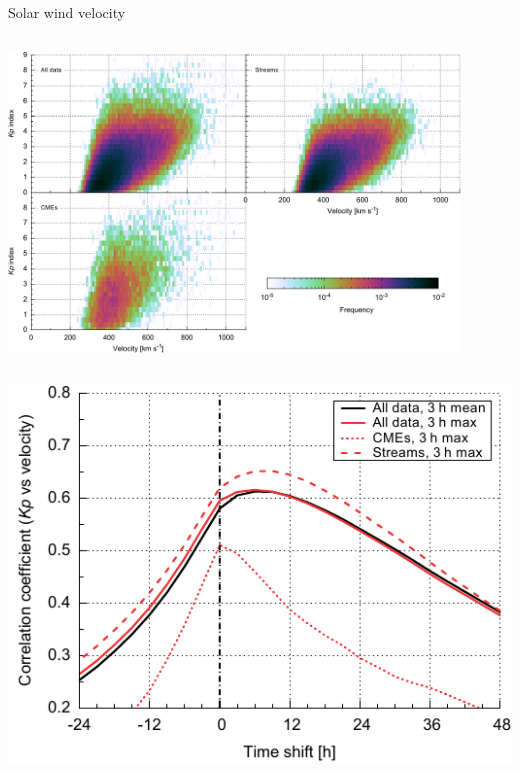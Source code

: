 \begin{frame}[plain,c]{Solar wind velocity}{}
	\begin{columns}[c]
	\column{\textwidth}
		
		\centering
		\includegraphics[width=0.9\textwidth]{../figures_of_mine/chapter2/Kp_2dhistogram_V_sws_e.pdf}

	\end{columns}
\end{frame}
\begin{frame}[plain,c]{}{}
	\begin{columns}[c]
		
	

		\includegraphics[width=\textwidth]{../figures_of_mine/chapter2/cc_lag_sws_f.pdf}
		
	\end{columns}
\end{frame}

